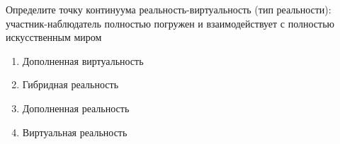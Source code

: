 
Определите точку континуума реальность-виртуальность (тип реальности): \linebreak участник-наблюдатель полностью погружен и взаимодействует с полностью искусственным миром

\begin{enumerate}
    \item Дополненная виртуальность
    \item Гибридная реальность
    \item Дополненная реальность
    \item Виртуальная реальность
\end{enumerate}